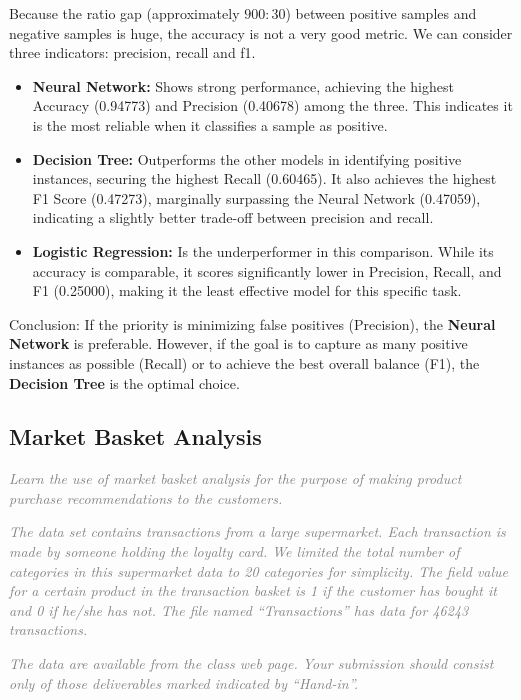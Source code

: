 \documentclass{article}
\begin{document}
Because the ratio gap (approximately $900:30$) between positive samples and negative samples is huge, the accuracy is not a very good metric. We can consider three indicators: precision, recall and f1.
\begin{itemize}
    \item \textbf{Neural Network:} Shows strong performance, achieving the highest Accuracy (0.94773) and Precision (0.40678) among the three. This indicates it is the most reliable when it classifies a sample as positive.
    \item \textbf{Decision Tree:} Outperforms the other models in identifying positive instances, securing the highest Recall (0.60465). It also achieves the highest F1 Score (0.47273), marginally surpassing the Neural Network (0.47059), indicating a slightly better trade-off between precision and recall.
    \item \textbf{Logistic Regression:} Is the underperformer in this comparison. While its accuracy is comparable, it scores significantly lower in Precision, Recall, and F1 (0.25000), making it the least effective model for this specific task.
\end{itemize}

Conclusion: If the priority is minimizing false positives (Precision), the \textbf{Neural Network} is preferable. However, if the goal is to capture as many positive instances as possible (Recall) or to achieve the best overall balance (F1), the \textbf{Decision Tree} is the optimal choice.



\subsection{Market Basket Analysis}
\textcolor{gray}{\it Learn the use of market basket analysis for the purpose of making product purchase recommendations to the customers.}

\textcolor{gray}{\it The data set contains transactions from a large supermarket. Each transaction is made by someone holding the loyalty card. We limited the total number of categories in this supermarket data to 20 categories for simplicity. The field value for a certain product in the transaction basket is 1 if the customer has bought it and 0 if he/she has not. The file named ``Transactions'' has data for 46243 transactions.}

\textcolor{gray}{\it The data are available from the class web page. Your submission should consist only of those deliverables marked indicated by ``Hand-in''.}
\end{document}
